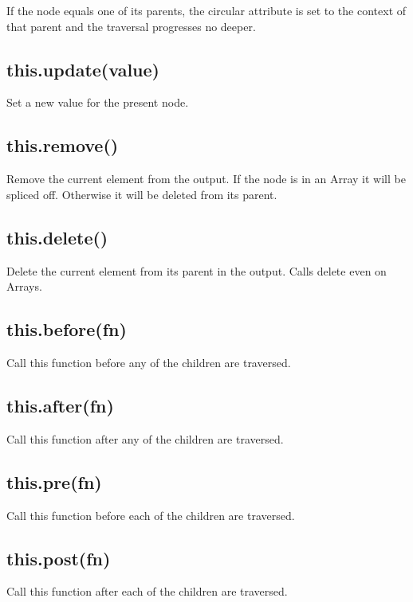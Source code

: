 If the node equals one of its parents, the {\ttfamily circular} attribute is set to the context of that parent and the traversal progresses no deeper.

\subsection*{this.\+update(value) }

Set a new value for the present node.

\subsection*{this.\+remove() }

Remove the current element from the output. If the node is in an Array it will be spliced off. Otherwise it will be deleted from its parent.

\subsection*{this.\+delete() }

Delete the current element from its parent in the output. Calls {\ttfamily delete} even on Arrays.

\subsection*{this.\+before(fn) }

Call this function before any of the children are traversed.

\subsection*{this.\+after(fn) }

Call this function after any of the children are traversed.

\subsection*{this.\+pre(fn) }

Call this function before each of the children are traversed.

\subsection*{this.\+post(fn) }

Call this function after each of the children are traversed.

